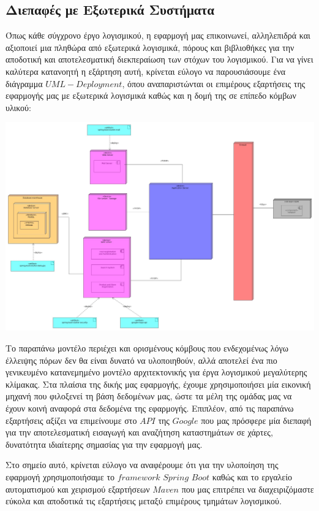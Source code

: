 \documentclass[12pt]{article}
\begin{document}
\newpage

\subsection{Διεπαφές με Εξωτερικά Συστήματα}

Όπως κάθε σύγχρονο έργο λογισμικού, η εφαρμογή μας επικοινωνεί, αλληλεπιδρά και αξιοποιεί μια πληθώρα από εξωτερικά λογισμικά, πόρους και βιβλιοθήκες για την αποδοτική και αποτελεσματική διεκπεραίωση των στόχων του λογισμικού. Για να γίνει καλύτερα κατανοητή η εξάρτηση αυτή, κρίνεται εύλογο να παρουσιάσουμε ένα διάγραμμα $UML-Deployment$, όπου αναπαριστώνται οι επιμέρους εξαρτήσεις της εφαρμογής μας με εξωτερικά λογισμικά καθώς και η δομή της σε επίπεδο κόμβων υλικού:

\begin{center}
\includegraphics[scale=0.22]{UML/deploymentDiagram.jpg}
\end{center}

Το παραπάνω μοντέλο περιέχει και ορισμένους κόμβους που ενδεχομένως λόγω έλλειψης πόρων δεν θα είναι δυνατό να υλοποιηθούν, αλλά αποτελεί ένα πιο γενικευμένο κατανεμημένο μοντέλο αρχιτεκτονικής για έργα λογισμικού μεγαλύτερης κλίμακας. Στα πλαίσια της δικής μας εφαρμογής, έχουμε χρησιμοποιήσει μία εικονική μηχανή που φιλοξενεί τη βάση δεδομένων μας, ώστε τα μέλη της ομάδας μας να έχουν κοινή αναφορά στα δεδομένα της εφαρμογής. Επιπλέον, από τις παραπάνω εξαρτήσεις αξίζει να επιμείνουμε στο $API$ της $Google$ που μας πρόσφερε μία διεπαφή για την αποτελεσματική εισαγωγή και αναζήτηση καταστημάτων σε χάρτες, δυνατότητα ιδιαίτερης σημασίας για την εφαρμογή μας.

Στο σημείο αυτό, κρίνεται εύλογο να αναφέρουμε ότι για την υλοποίηση της εφαρμογή χρησιμοποιήσαμε το $framework$ $Spring$ $Boot$ καθώς και το εργαλείο αυτοματισμού και χειρισμού εξαρτήσεων $Maven$ που μας επιτρέπει να διαχειριζόμαστε εύκολα και αποδοτικά τις εξαρτήσεις μεταξύ επιμέρους τμημάτων λογισμικού.
\end{document}
